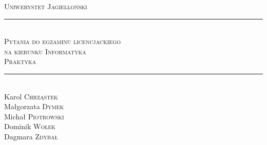 \documentclass[12pt]{article}
\begin{document}
    \begin{titlepage}

        \newcommand{\HRule}{\rule{\linewidth}{0.5mm}}

        \center

        \textsc{\LARGE Uniwerystet Jagielloński}\\[1.5cm]

        \HRule \\[0.4cm]
        \textsc{\Large Pytania do egzaminu licencjackiego}\\[0.4cm]
        \textsc{\large na kierunku Informatyka}\\[0.4cm]
        \textsc{\Large Praktyka}\\[0.4cm]
        \HRule \\[1.0cm]

        \Large %
        Karol \textsc{Chrząstek}\\
        Małgorzata \textsc{Dymek}\\
        Michał \textsc{Piotrowski}\\
        Dominik \textsc{Wołek}\\
        Dagmara \textsc{Zdybał}\\[1.5cm]


\end{titlepage}
\end{document}
